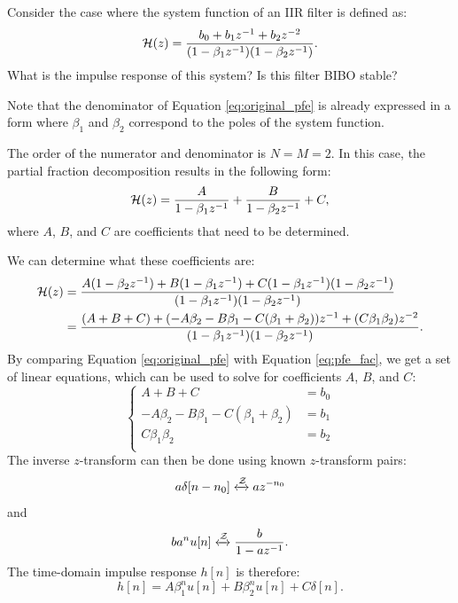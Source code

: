 Consider the case where the system function of an IIR filter is defined as:
\begin{equation}
    \mathcal{H}(z)= \frac{b_0 + b_1 z^{-1} + b_2 z^{-2}}{(1-\beta_1 z^{-1})(1-\beta_2 z^{-1})}.
    \label{eq:original_pfe}
\end{equation}
What is the impulse response of this system? Is this filter BIBO stable?

Note that the denominator of Equation \ref{eq:original_pfe} is already
expressed in a form where $\beta_1$ and $\beta_2$ correspond to the poles
of the system function.

The order of the numerator and denominator is $N=M=2$. In this case,
the partial fraction decomposition results in the following form:
\begin{equation}
    \mathcal{H}(z) = \frac{A}{1-\beta_1 z^{-1}} + \frac{B}{1-\beta_2 z^{-1}} + C,
\end{equation}
where $A$, $B$, and $C$ are coefficients that need to be determined.

We can determine what these coefficients are:
\begin{align}
    \mathcal{H}(z) & = \frac{A(1-\beta_2 z^{-1})+B(1-\beta_1 z^{-1})+C(1-\beta_1 z^{-1})(1-\beta_2 z^{-1})}{(1-\beta_1 z^{-1})(1-\beta_2 z^{-1})}                              \\
         & = \frac{ (A+B+C) + (-A\beta_2 -B \beta_1 - C(\beta_1+\beta_2))z^{-1} + (C\beta_1 \beta_2)z^{-2}}{(1-\beta_1 z^{-1})(1-\beta_2 z^{-1})}\label{eq:pfe_fac}.
\end{align}
By comparing Equation \ref{eq:original_pfe} with
Equation \ref{eq:pfe_fac}, we get a set of linear equations, which can
be used to solve for coefficients $A$, $B$, and $C$:
\begin{equation}
    \left\{ \begin{array}{cc}
        A+B+C                                 & = b_0 \\
        -A\beta_2-B\beta_1-C(\beta_1+\beta_2) & = b_1 \\
        C\beta_1\beta_2                       & = b_2 \\
    \end{array}
    \right.
\end{equation}
The inverse $z$-transform can then be done using known $z$-transform pairs:
\begin{equation}
    a\delta[n-n_0] \xleftrightarrow{\mathcal{Z}} a z^{-n_0}
\end{equation}
and
\begin{equation}
    b a^n u[n] \xleftrightarrow{\mathcal{Z}} \frac{b}{1-az^{-1}}.
\end{equation}
The time-domain impulse response $h[n]$ is therefore:
\begin{equation}
    h[n] = A \beta_1^n u[n] + B \beta_2^n u[n] + C\delta[n].
\end{equation}

